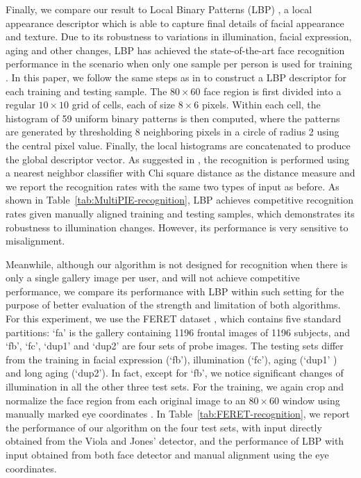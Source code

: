 \documentclass[12pt,journal,draftcls,letterpaper,onecolumn]{IEEEtran}
\begin{document}
Finally, we compare our result to Local Binary Patterns (LBP)
\cite{Ahonen2006-PAMI}, a local appearance descriptor which is
able to capture final details of facial appearance and texture.
Due to its robustness to variations in illumination, facial
expression, aging and other changes, LBP has achieved the
state-of-the-art face recognition performance in the scenario
when only one sample per person is used for training
\cite{Tan06facerecognition}. In this paper, we follow the same
steps as in \cite{Ahonen2006-PAMI} to construct a LBP
descriptor for each training and testing sample. The $80\times
60$ face region is first divided into a regular $10\times 10$
grid of cells, each of size $8\times 6$ pixels. Within each
cell, the histogram of 59 uniform binary patterns is then
computed, where the patterns are generated by thresholding 8
neighboring pixels in a circle of radius 2 using the central
pixel value. Finally, the local histograms are concatenated to
produce the global descriptor vector. As suggested in
\cite{Ahonen2006-PAMI}, the recognition is performed using a
nearest neighbor classifier with Chi square distance as the
distance measure and we report the recognition rates with the
same two types of input as before. As shown in
Table~\ref{tab:MultiPIE-recognition}, LBP achieves competitive
recognition rates given manually aligned training and testing
samples, which demonstrates its robustness to illumination
changes. However, its performance is very sensitive to
misalignment. 

Meanwhile, although our algorithm is not designed for
recognition when there is only a single gallery image per user,
and will not achieve competitive performance, we compare its
performance with LBP within such setting for the purpose of
better evaluation of the strength and limitation of both
algorithms. For this experiment, we use the FERET dataset
\cite{phillips1998feret}, which contains five standard
partitions: `fa' is the gallery containing 1196 frontal images
of 1196 subjects, and `fb', `fc', `dup1' and `dup2' are four
sets of probe images. The testing sets differ from the training
in facial expression (`fb'), illumination (`fc'), aging (`dup1'
) and long aging (`dup2'). In fact, except for `fb', we notice
significant changes of illumination in all the other three test
sets. For the training, we again crop and normalize the face
region from each original image to an $80\times 60$ window
using manually marked eye coordinates \cite{Deng2010-PR}. In
Table~\ref{tab:FERET-recognition}, we report the performance of
our algorithm on the four test sets, with input directly
obtained from the Viola and Jones' detector, and the
performance of LBP with input obtained from both face detector
and manual alignment using the eye coordinates.
\end{document}
